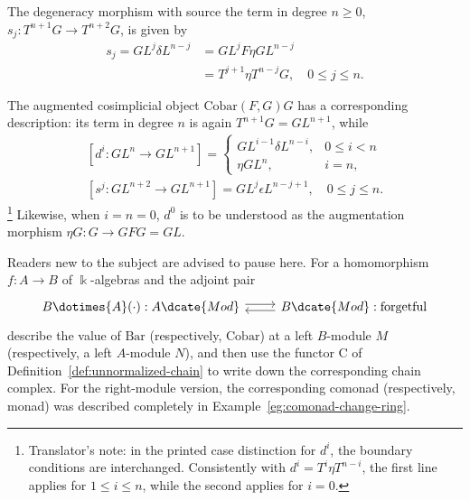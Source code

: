 \begin{example}
	The degeneracy morphism with source the term in degree $n\geq0$,
	$s_j:T^{n+1}G\to T^{n+2}G$, is given by
	\begin{align*}
		s_j = G L^j \delta L^{n-j} & =
		G L^j F \eta G L^{n-j} \\
		& = T^{j+1} \eta T^{n-j} G, \quad 0 \leq j \leq n.
	\end{align*}

	The augmented cosimplicial object $\mathrm{Cobar}(F,G)G$ has a
	corresponding description: its term in degree $n$ is again
	$T^{n+1}G=GL^{n+1}$, while
	\begin{gather*}
		\left[ d^i: GL^n \to GL^{n+1} \right] =
		\begin{cases}
			GL^{i-1} \delta L^{n-i}, & 0 \leq i < n \\
			\eta GL^n , & i = n,
		\end{cases} \\
		\left[ s^j: GL^{n+2} \to GL^{n+1} \right] =
		GL^j \epsilon L^{n-j+1}, \quad 0 \leq j \leq n.
	\end{gather*}
	\footnote{Translator's note: in the printed case distinction for $d^i$,
	the boundary conditions are interchanged. Consistently with
	$d^i=T^i\eta T^{n-i}$, the first line applies for $1\leq i\leq n$,
	while the second applies for $i=0$.}
	Likewise, when $i=n=0$, $d^0$ is to be understood as the augmentation
	morphism $\eta G:G\to GFG=GL$.
\end{example}

Readers new to the subject are advised to pause here. For a homomorphism
$f:A\to B$ of $\Bbbk$-algebras and the adjoint pair
\[\begin{tikzcd}
	B \dotimes{A} (\cdot): A\dcate{Mod} \arrow[shift left, r] & B\dcate{Mod}: \text{forgetful} \arrow[shift left, l]
\end{tikzcd}\]
describe the value of $\mathrm{Bar}$ (respectively, $\mathrm{Cobar}$) at a
left $B$-module $M$ (respectively, a left $A$-module $N$), and then use the
functor $\mathrm{C}$ of Definition~\ref{def:unnormalized-chain} to write down
the corresponding chain complex. For the right-module version, the
corresponding comonad (respectively, monad) was described completely in
Example~\ref{eg:comonad-change-ring}.

